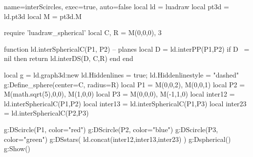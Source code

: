\documentclass{standalone}
\begin{document}
\begin{luadraw}{name=interScircles, exec=true, auto=false}
local ld = luadraw
local pt3d = ld.pt3d
local M = pt3d.M

require 'luadraw_spherical'
local C, R = M(0,0,0), 3

function ld.interSphericalC(P1, P2) -- planes
    local D = ld.interPP(P1,P2)
    if D ~= nil then
        return ld.interDS(D, {C,R})
    end
end

local g = ld.graph3d:new{}
ld.Hiddenlines = true; ld.Hiddenlinestyle = "dashed"
g:Define_sphere({center=C, radius=R})
local P1 = {M(0,0,2), M(0,0,1)}
local P2 = {M(math.sqrt(5),0,0), M(1,0,0)}
local P3 = {M(0,0,0), M(-1,1,0)}
local inter12 = { ld.interSphericalC(P1,P2) }
local inter13 = { ld.interSphericalC(P1,P3) }
local inter23 = { ld.interSphericalC(P2,P3) }

g:DScircle(P1, {color="red"})
g:DScircle(P2, {color="blue"})
g:DScircle(P3, {color="green"})
g:DSstars( ld.concat(inter12,inter13,inter23) )
g:Dspherical()
g:Show()
\end{luadraw}
\end{document}
